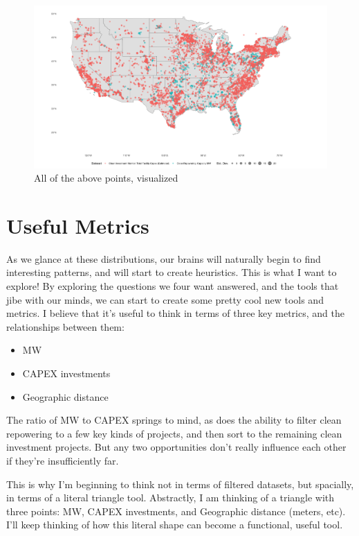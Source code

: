 \documentclass{article}
\begin{document}
\begin{figure}
  \includegraphics[width=\linewidth]{images/points.png}
  \caption{All of the above points, visualized}
\end{figure}


\section{Useful Metrics}

As we glance at these distributions, our brains will naturally begin to find interesting patterns, and will start to create heuristics. 
This is what I want to explore!
By exploring the questions we four want answered, and the tools that jibe with our minds, we can start to create some pretty cool new tools and metrics.
I believe that it's useful to think in terms of three key metrics, and the relationships between them:
\begin{itemize}
\item MW
\item CAPEX investments
\item Geographic distance
\end{itemize}

The ratio of MW to CAPEX springs to mind, as does the ability to filter clean repowering to a few key kinds of projects, and then sort to the remaining clean investment projects.
But any two opportunities don't really influence each other if they're insufficiently far.

This is why I'm beginning to think not in terms of filtered datasets, but spacially, in terms of a literal triangle tool.
Abstractly, I am thinking of a triangle with three points: MW, CAPEX investments, and Geographic distance (meters, etc). 
I'll keep thinking of how this literal shape can become a functional, useful tool.
\end{document}
